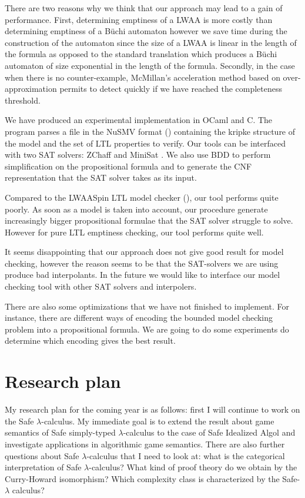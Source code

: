 There are two reasons why we think that our approach may lead to a
gain of performance. First, determining emptiness of a LWAA is more
costly than determining emptiness of a B\"uchi automaton however we
save time during the construction of the automaton since the size of
a LWAA is linear in the length of the formula as opposed to the
standard translation which produces a B\"uchi automaton of size
exponential in the length of the formula. Secondly, in the case when
there is no counter-example, McMillan's acceleration method based on
over-approximation permits to detect quickly if we have reached the
completeness threshold.


We have produced an experimental implementation in OCaml and C. The
program parses a file in the NuSMV format (\cite{CAV02:nusmv})
containing the kripke structure of the model and the set of LTL
properties to verify. Our tools can be interfaced with two SAT
solvers: ZChaff \citep{zChaff} and MiniSat \citep{ES03}. We also use
BDD to perform simplification on the propositional formula and to
generate the CNF representation that the SAT solver takes as its
input.

Compared to the LWAASpin LTL model checker (\cite{hammer:truly}),
our tool performs quite poorly. As soon as a model is taken into
account, our procedure generate increasingly bigger propositional
formulae that the SAT solver struggle to solve. However for pure LTL
emptiness checking, our tool performs quite well.

It seems disappointing that our approach does not give good result
for model checking, however the reason seems to be that the
SAT-solvers we are using produce bad interpolants. In the future we
would like to interface our model checking tool with other SAT
solvers and interpolers.

There are also some optimizations that we have not finished to
implement. For instance, there are different ways of encoding the
bounded model checking problem into a propositional formula. We are
going to do some experiments do determine which encoding gives the
best result.

\chapter{Research plan}

My research plan for the coming year is as follows: first I will
continue to work on the Safe $\lambda$-calculus. My immediate goal
is to extend the result about game semantics of Safe simply-typed
$\lambda$-calculus to the case of Safe Idealized Algol and
investigate applications in algorithmic game semantics. There are
also further questions about Safe $\lambda$-calculus that I need to
look at: what is the categorical interpretation of Safe
$\lambda$-calculus? What kind of proof theory do we obtain by the
Curry-Howard isomorphism? Which complexity class is characterized by
the Safe-$\lambda$ calculus?

